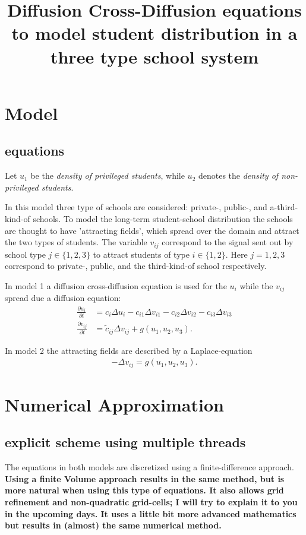 \documentclass[12pt,a4paper]{article}
\title{Diffusion Cross-Diffusion equations to model student distribution in a three type school system}
\newcommand{\ita}[1]{\textit{#1}}
\newcommand{\bol}[1]{\textbf{#1}}
\begin{document}
\maketitle

\section{Model}

\subsection{equations}
Let $u_{1}$ be the \ita{density of privileged students}, while $u_{2}$ denotes the \ita{density of non-privileged students}. 

In this model three type of schools are considered: private-, public-, and a-third-kind-of schools. To model the long-term student-school distribution the schools are thought to have 'attracting fields', which spread over the domain and attract the two types of students. The variable $v_{ij}$ correspond to the signal sent out by school type $j \in \{1,2,3\}$ to attract students of type $i \in \{1,2\}$. Here $j=1,2,3$ correspond to private-, public, and the third-kind-of school respectively. 

In model 1 a diffusion cross-diffusion equation is used for the $u_{i}$ while the $v_{ij}$ spread due a diffusion equation:
\begin{align}
\frac{\partial u_{i}}{\partial t} &= c_{i} \Delta u_{i} - c_{i1} \Delta v_{i1} - c_{i2} \Delta v_{i2} - c_{i3} \Delta v_{i3} \label{eq:model_1_1} \\
\frac{\partial v_{ij}}{\partial t} &= \tilde{c}_{ij} \Delta v_{ij} + g \left(u_{1},u_{2},u_{3} \right). \label{eq:model_1_2}
\end{align}

In model 2 the attracting fields are described by a Laplace-equation
\begin{align}
- \Delta v_{ij} = g \left(u_{1},u_{2},u_{3} \right). \label{eq:model_2_1}
\end{align}


\section{Numerical Approximation}

\subsection{explicit scheme using multiple threads}
The equations in both models are discretized using a finite-difference approach. \bol{Using a finite Volume approach results in the same method, but is more natural when using this type of equations. It also allows grid refinement and non-quadratic grid-cells; I will try to explain it to you in the upcoming days. It uses a little bit more advanced mathematics but results in (almost) the same numerical method.}
\end{document}
